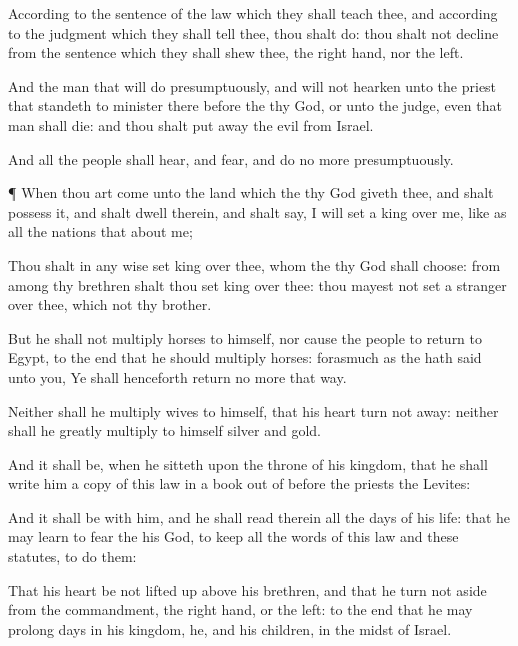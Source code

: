 {According to the
sentence of the
law which they shall
teach thee, and according to the
judgment which they shall
tell thee, thou shalt
do: thou shalt not
decline from the
sentence which they shall
shew thee,
{} the right
hand, nor
{} the
left.

And the
man that will
do
presumptuously, and will not
hearken unto the
priest that
standeth to
minister there before the
{} thy
God, or unto the
judge, even that
man shall
die: and thou shalt put
away the
evil from
Israel.

And all the
people shall
hear, and
fear, and do no more
presumptuously.


\par }{\PP {}¶ When thou art
come unto the
land which the
{} thy
God
giveth thee, and shalt
possess it, and shalt
dwell therein, and shalt
say, I will
set a
king over me, like as all the
nations that
{}
about me;

Thou shalt in any
wise
set
{}
king over thee, whom the
{} thy
God shall
choose:
{} from
among thy
brethren shalt thou
set
king over thee: thou
mayest not
set a
stranger over thee, which
{} not thy
brother.

But he shall not
multiply
horses to himself, nor cause the
people to
return to
Egypt, to the end that he should
multiply
horses: forasmuch as the
{} hath
said unto you, Ye shall
henceforth
return no more that
way.

Neither shall he
multiply
wives to himself, that his
heart
turn not away: neither shall he
greatly
multiply to himself
silver and
gold.

And it shall be, when he
sitteth upon the
throne of his
kingdom, that he shall
write him a
copy of this
law in a
book out of
{}
before the
priests the
Levites:

And it shall be with him, and he shall
read therein all the
days of his
life: that he may
learn to
fear the
{} his
God, to
keep all the
words of this
law and these
statutes, to
do them:

That his
heart be not lifted
up above his
brethren, and that he turn not
aside from the
commandment,
{} the right
hand, or
{} the
left: to the end that he may
prolong
{}
days in his
kingdom, he, and his
children, in the
midst of
Israel.




}
